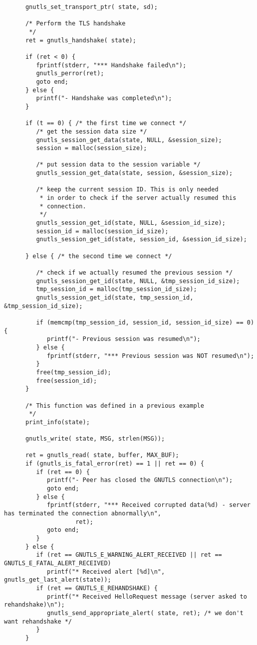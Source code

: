 \begin{verbatim}
      gnutls_set_transport_ptr( state, sd);

      /* Perform the TLS handshake
       */
      ret = gnutls_handshake( state);

      if (ret < 0) {
         fprintf(stderr, "*** Handshake failed\n");
         gnutls_perror(ret);
         goto end;
      } else {
         printf("- Handshake was completed\n");
      }

      if (t == 0) { /* the first time we connect */
         /* get the session data size */
         gnutls_session_get_data(state, NULL, &session_size);
         session = malloc(session_size);

         /* put session data to the session variable */
         gnutls_session_get_data(state, session, &session_size);

         /* keep the current session ID. This is only needed
          * in order to check if the server actually resumed this
          * connection.
          */
         gnutls_session_get_id(state, NULL, &session_id_size);
         session_id = malloc(session_id_size);
         gnutls_session_get_id(state, session_id, &session_id_size);

      } else { /* the second time we connect */

         /* check if we actually resumed the previous session */
         gnutls_session_get_id(state, NULL, &tmp_session_id_size);
         tmp_session_id = malloc(tmp_session_id_size);
         gnutls_session_get_id(state, tmp_session_id, &tmp_session_id_size);

         if (memcmp(tmp_session_id, session_id, session_id_size) == 0) {
            printf("- Previous session was resumed\n");
         } else {
            fprintf(stderr, "*** Previous session was NOT resumed\n");
         }
         free(tmp_session_id);
         free(session_id);
      }

      /* This function was defined in a previous example
       */
      print_info(state);

      gnutls_write( state, MSG, strlen(MSG));

      ret = gnutls_read( state, buffer, MAX_BUF);
      if (gnutls_is_fatal_error(ret) == 1 || ret == 0) {
         if (ret == 0) {
            printf("- Peer has closed the GNUTLS connection\n");
            goto end;
         } else {
            fprintf(stderr, "*** Received corrupted data(%d) - server has terminated the connection abnormally\n",
                    ret);
            goto end;
         }
      } else {
         if (ret == GNUTLS_E_WARNING_ALERT_RECEIVED || ret == GNUTLS_E_FATAL_ALERT_RECEIVED)
            printf("* Received alert [%d]\n", gnutls_get_last_alert(state));
         if (ret == GNUTLS_E_REHANDSHAKE) {
            printf("* Received HelloRequest message (server asked to rehandshake)\n");
            gnutls_send_appropriate_alert( state, ret); /* we don't want rehandshake */
         }
      }


\end{verbatim}
